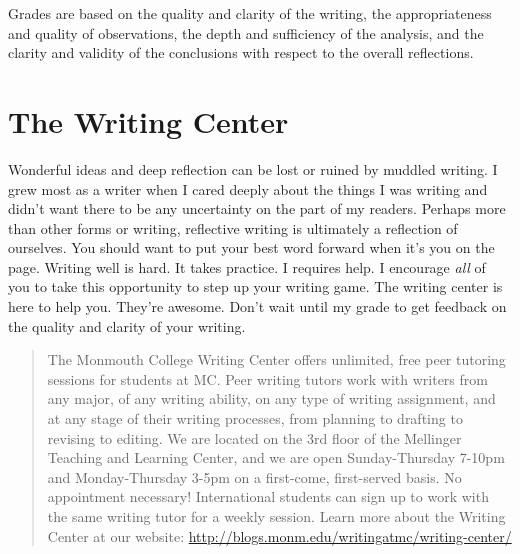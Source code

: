 \documentclass[]{tufte-handout}
\begin{document}
Grades are based on the quality and clarity of the writing, the appropriateness and quality of observations, the depth and sufficiency of the analysis, and the clarity and validity of the conclusions with respect to the overall reflections.  

\section{The Writing Center}

Wonderful ideas and deep reflection can be lost or ruined by muddled writing.  I grew most as a writer when I cared deeply about the things I was writing and didn't want there to be any uncertainty on the part of my readers. Perhaps more than other forms or writing, reflective writing is ultimately a reflection of ourselves. You should want to put your best word forward when it's you on the page. Writing well is hard. It takes practice. I requires help. I encourage \textit{all} of you to take this opportunity to step up your writing game. The writing center is here to help you. They're awesome. Don't wait until my grade to get feedback on the quality and clarity of your writing.  
\begin{quote}
The Monmouth College Writing Center offers unlimited, free peer tutoring sessions for students at MC.  Peer writing tutors work with writers from any major, of any writing ability, on any type of writing assignment, and at any stage of their writing processes, from planning to drafting to revising to editing.  We are located on the 3rd floor of the Mellinger Teaching and Learning Center, and we are open Sunday-Thursday 7-10pm and Monday-Thursday 3-5pm on a first-come, first-served basis.  No appointment necessary!  International students can sign up to work with the same writing tutor for a weekly session. Learn more about the Writing Center at our website: \url{http://blogs.monm.edu/writingatmc/writing-center/}
\end{quote}
\end{document}
